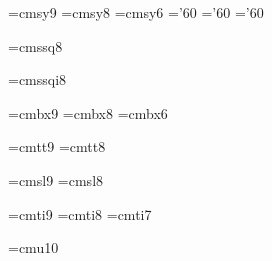 \font\ninesy=cmsy9
\font\eightsy=cmsy8
\font\sixsy=cmsy6
\skewchar\ninesy='60 \skewchar\eightsy='60 \skewchar\sixsy='60

\font\eightss=cmssq8

\font\eightssi=cmssqi8

\font\ninebf=cmbx9
\font\eightbf=cmbx8
\font\sixbf=cmbx6

\font\ninett=cmtt9
\font\eighttt=cmtt8

\hyphenchar{} %
\hyphenchar{}
\hyphenchar{}

\font\ninesl=cmsl9
\font\eightsl=cmsl8

\font\nineit=cmti9
\font\eightit=cmti8
\font\sevenit=cmti7

\font\tenu=cmu10 %

\newskip\ttglue
\def\tenpoint{\def\rm{\fam0\tenrm}%
  \textfont0=\tenrm \scriptfont0=\sevenrm \scriptscriptfont0=\fiverm
  \textfont1=\teni \scriptfont1=\seveni \scriptscriptfont1=\fivei
  \textfont2=\tensy \scriptfont2=\sevensy \scriptscriptfont2=\fivesy
  \textfont3=\tenex \scriptfont3=\tenex \scriptscriptfont3=\tenex
  \def\it{\fam\itfam\tenit}\textfont\itfam=\tenit
  \def\sl{\fam\slfam\tensl}\textfont\slfam=\tensl
  \def\bf{\fam\bffam\tenbf}\textfont\bffam=\tenbf \scriptfont\bffam=\sevenbf
  \scriptscriptfont\bffam=\fivebf
  \normalbaselineskip=12pt
  \let\sc=\eightrm
  \let\big=\tenbig
  \setbox\strutbox=\hbox{\vrule height8.5pt depth3.5pt width\z@}%
  \normalbaselines\rm}

\def\twelvepoint{\def\rm{\fam0\twelverm}%
  \textfont0=\twelverm \scriptfont0=\ninerm \scriptscriptfont0=\sevenrm
  \textfont1=\twelvei \scriptfont1=\ninei \scriptscriptfont1=\seveni
  \textfont2=\twelvesy \scriptfont2=\ninesy \scriptscriptfont2=\sevensy
  \textfont3=\tenex \scriptfont3=\tenex \scriptscriptfont3=\tenex
  \def\it{\fam\itfam\twelveit}\textfont\itfam=\twelveit
  \def\sl{\fam\slfam\twelvesl}\textfont\slfam=\twelvesl
  \def\bf{\fam\bffam\twelvebf}\textfont\bffam=\twelvebf
                                           \scriptfont\bffam=\ninebf
  \scriptscriptfont\bffam=\sevenbf
  \normalbaselineskip=12pt
  \let\sc=\eightrm
  \let\big=\tenbig
  \setbox\strutbox=\hbox{\vrule height8.5pt depth3.5pt width\z@}%
  \normalbaselines\rm}

\def\fourteenpoint{\def\rm{\fam0\fourteenrm}%
  \textfont0=\fourteenrm \scriptfont0=\tenrm \scriptscriptfont0=\sevenrm
  \textfont1=\fourteeni \scriptfont1=\teni \scriptscriptfont1=\seveni
  \textfont2=\fourteensy \scriptfont2=\tensy \scriptscriptfont2=\sevensy
  \textfont3=\tenex \scriptfont3=\tenex \scriptscriptfont3=\tenex
  \def\it{\fam\itfam\fourteenit}\textfont\itfam=\fourteenit
  \def\sl{\fam\slfam\fourteensl}\textfont\slfam=\fourteensl
  \def\bf{\fam\bffam\fourteenbf}\textfont\bffam=\fourteenbf%
  \scriptfont\bffam=\tenbf
  \scriptscriptfont\bffam=\sevenbf
  \normalbaselineskip=17pt
  \let\sc=\elevenrm
  \let\big=\tenbig
  \setbox\strutbox=\hbox{\vrule height8.5pt depth3.5pt width\z@}%
  \normalbaselines\rm}

